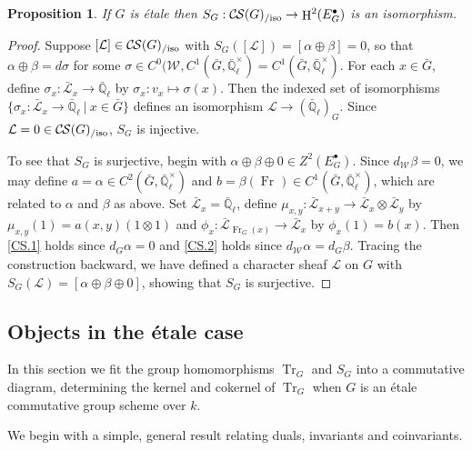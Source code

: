 \documentclass[10pt]{amsart}
\theoremstyle{plain}
\newtheorem{proposition}[theorem]{Proposition}
\theoremstyle{definition}
\newtheorem{remark}[theorem]{Remark}
\newcommand{\EE}{\mathbb{\bar Q}_\ell}
\newcommand{\Fq}{k}
\newcommand{\EEx}{\EE^\times}
\newcommand{\Weil}[1]{\mathcal{W}_{#1}}
\newcommand{\Frob}[1]{\operatorname{Fr}_{#1}}
\DeclareMathOperator{\Hh}{H}
\newcommand{\tq}{{\ \vert\ }}
\newcommand{\TrFrob}[1]{\operatorname{Tr}_{#1}}
\newcommand{\cs}[1]{{\mathcal{#1}}}
\newcommand{\gcs}[1]{{\mathcal{\bar #1}}}
\newcommand{\CS}{{\mathcal{C\hskip-0.8pt S}}}
\newcommand{\CSiso}[1]{\CS(#1)_{/\text{iso}}}
\newcommand{\bG}{\bar{G}}
\begin{document}

\begin{proposition}\label{prop:SGiso}
If $G$ is \'etale then $S_G:  \CSiso{G} \to \Hh^2(E^\bullet_G)$ is an isomorphism.
\end{proposition}
\begin{proof}
Suppose $[\cs{L}] \in \CSiso{G}$ with $S_G([\cs{L}]) = [\alpha \oplus \beta] = 0$,
so that $\alpha \oplus \beta = d\sigma$ for some $\sigma \in C^0(\Weil{},C^1(\bG,\EEx) = C^1(\bG,\EEx)$.
For each $x\in \bG$, define $\sigma_x : \gcs{L}_x \to \EE$ by $\sigma_x : v_x \mapsto \sigma(x)$.
Then the indexed set of isomorphisms $\{ \sigma_x : \gcs{L}_x \to \EE \tq x\in \bG\}$
defines an isomorphism $\cs{L} \to (\EE)_G$.
Since $\cs{L} = 0 \in \CSiso{G}$, $S_G$ is injective.

To see that $S_G$ is surjective, begin with $\alpha\oplus\beta\oplus 0 \in Z^2(E^\bullet_G)$.
Since $d_{\Weil{}} \beta = 0$, we may define $a = \alpha \in C^2(\bG,\EEx)$ and
$b = \beta(\Frob{}) \in C^1(\bG,\EEx)$, which are related to $\alpha$ and $\beta$ as above.
Set $\gcs{L}_x = \EE$, define $\mu_{x,y} : \gcs{L}_{x+y} \to \gcs{L}_x\otimes\gcs{L}_y$
by $\mu_{x,y}(1) = a(x,y) (1\otimes 1)$ and $\phi_x : \gcs{L}_{\Frob{G}(x)} \to \gcs{L}_x$ by $\phi_x(1)= b(x)$.
Then \ref{CS.1} holds since $d_G \alpha =0$ and \ref{CS.2} holds since $d_{\Weil{}}\alpha =d_G \beta$.
Tracing the construction backward, we have defined a character sheaf $\cs{L}$ on $G$ with
$S_G(\cs{L}) = [\alpha\oplus\beta\oplus 0]$, showing that $S_G$ is surjective.
\end{proof}


\subsection{Objects in the \'etale case}\label{ssec:SandT}

In this section we fit the group homomorphisms $\TrFrob{G}$ and $S_G$ into a commutative diagram,
determining the kernel and cokernel of $\TrFrob{G}$ when $G$ is an \'etale commutative group scheme over $\Fq$.

%
We begin with a simple, general result relating duals, invariants and coinvariants.
\end{document}
